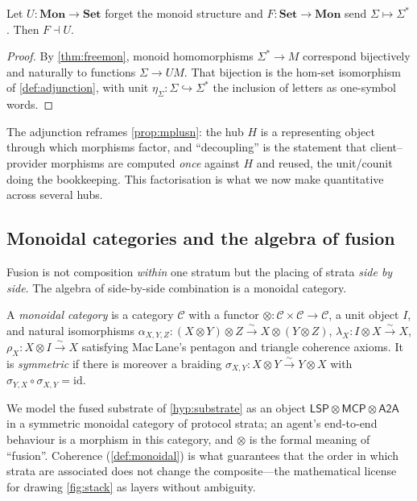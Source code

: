 \begin{proposition}
\label{prop:free-adj}
Let $U\colon\mathbf{Mon}\to\mathbf{Set}$ forget the monoid structure and
$F\colon\mathbf{Set}\to\mathbf{Mon}$ send $\Sigma\mapsto\Sigma^{*}$. Then
$F\dashv U$.
\end{proposition}
\begin{proof}
By \cref{thm:freemon}, monoid homomorphisms $\Sigma^{*}\to M$ correspond
bijectively and naturally to functions $\Sigma\to U M$. That bijection is the
hom-set isomorphism of \cref{def:adjunction}, with unit
$\eta_\Sigma\colon\Sigma\hookrightarrow\Sigma^{*}$ the inclusion of letters as
one-symbol words.
\end{proof}

The adjunction reframes \cref{prop:mplusn}: the hub $H$ is a representing object
through which morphisms factor, and ``decoupling'' is the statement that
client--provider morphisms are computed \emph{once} against $H$ and reused, the
unit/counit doing the bookkeeping. This factorisation is what we now make
quantitative across several hubs.

\subsection{Monoidal categories and the algebra of fusion}
\label{sec:alg-monoidal}

Fusion is not composition \emph{within} one stratum but the placing of strata
\emph{side by side}. The algebra of side-by-side combination is a monoidal
category.

\begin{definition}
\label{def:monoidal}
A \emph{monoidal category} is a category $\mathcal C$ with a functor
$\otimes\colon\mathcal C\times\mathcal C\to\mathcal C$, a unit object $I$, and
natural isomorphisms $\alpha_{X,Y,Z}\colon(X\otimes Y)\otimes Z\xrightarrow{\sim}
X\otimes(Y\otimes Z)$, $\lambda_X\colon I\otimes X\xrightarrow{\sim}X$,
$\rho_X\colon X\otimes I\xrightarrow{\sim}X$ satisfying Mac\,Lane's pentagon and
triangle coherence axioms. It is \emph{symmetric} if there is moreover a braiding
$\sigma_{X,Y}\colon X\otimes Y\xrightarrow{\sim}Y\otimes X$ with
$\sigma_{Y,X}\circ\sigma_{X,Y}=\mathrm{id}$.
\end{definition}

\begin{notation}
We model the fused substrate of \cref{hyp:substrate} as an object
$\mathsf{LSP}\otimes\mathsf{MCP}\otimes\mathsf{A2A}$ in a symmetric monoidal
category of protocol strata; an agent's end-to-end behaviour is a morphism in
this category, and $\otimes$ is the formal meaning of ``fusion''. Coherence
(\cref{def:monoidal}) is what guarantees that the order in which strata are
associated does not change the composite---the mathematical license for drawing
\cref{fig:stack} as layers without ambiguity.
\end{notation}

